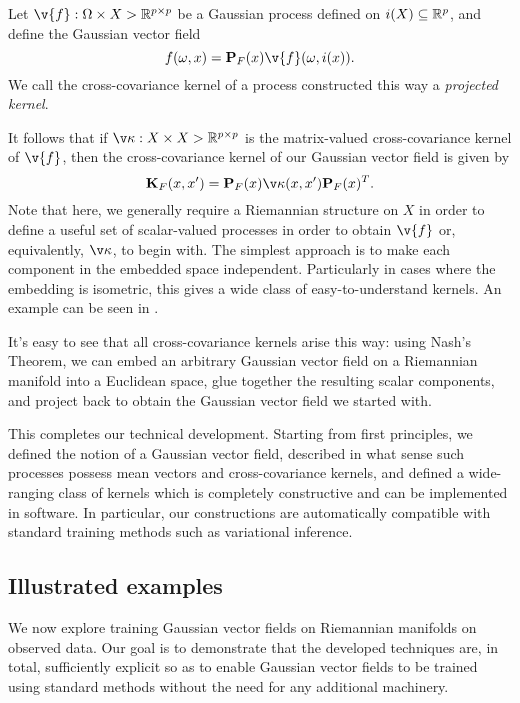 \documentclass[11pt]{book}
\begin{document}
\begin{definition}
Let $\v{f} : \Omega \x X \-> \R^{p\x p}$ be a Gaussian process defined on $i(X) \subseteq \mathbb{R}^p$, and define the Gaussian vector field
\[
f(\omega, x) = \m{P}_F(x) \v{f}(\omega, i(x))
.
\]
We call the cross-covariance kernel of a process constructed this way a \emph{projected kernel}.
\end{definition}

It follows that if $\v\kappa : X \x X \-> \R^{p \x p}$ is the matrix-valued cross-covariance kernel of $\v{f}$, then the cross-covariance kernel of our Gaussian vector field is given by 
\[
\m{K}_F(x,x') = \m{P}_F(x) \v\kappa(x,x') \m{P}_F(x)^T
.    
\]
Note that here, we generally require a Riemannian structure on $X$ in order to define a useful set of scalar-valued processes in order to obtain $\v{f}$ or, equivalently, $\v\kappa$, to begin with.
The simplest approach is to make each component in the embedded space independent.
Particularly in cases where the embedding is isometric, this gives a wide class of easy-to-understand kernels.
An example can be seen in .

It's easy to see that all cross-covariance kernels arise this way: using Nash's Theorem, we can embed an arbitrary Gaussian vector field on a Riemannian manifold into a Euclidean space, glue together the resulting scalar components, and project back to obtain the Gaussian vector field we started with.

This completes our technical development. 
Starting from first principles, we defined the notion of a Gaussian vector field, described in what sense such processes possess mean vectors and cross-covariance kernels, and defined a wide-ranging class of kernels which is completely constructive and can be implemented in software.
In particular, our constructions are automatically compatible with standard training methods such as variational inference.

\subsection{Illustrated examples}

We now explore training Gaussian vector fields on Riemannian manifolds on observed data. 
Our goal is to demonstrate that the developed techniques are, in total, sufficiently explicit so as to enable Gaussian vector fields to be trained using standard methods without the need for any additional machinery.
\end{document}

